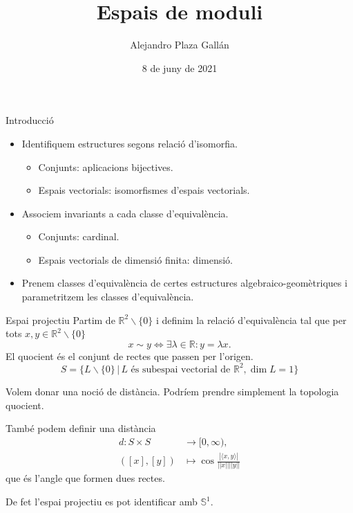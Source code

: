 \documentclass{beamer}
\title{Espais de moduli}
\author{Alejandro Plaza Gall\'{a}n}
\date{8 de juny de 2021}
\theoremstyle{definition}
\begin{document}
\begin{frame}
\titlepage
\end{frame}

\begin{frame}{Introducci\'{o}}
\begin{itemize}
\item Identifiquem estructures segons relaci\'{o} d'isomorfia.
\pause
\begin{itemize}
\item Conjunts: aplicacions bijectives.
\pause
\item Espais vectorials: isomorfismes d'espais vectorials.
\end{itemize}
\pause
\item Associem invariants a cada classe d'equival\`{e}ncia.
\pause
\begin{itemize}
\item Conjunts: cardinal.
\pause
\item Espais vectorials de dimensi\'{o} finita: dimensi\'{o}.
\end{itemize}
\pause
\item Prenem classes d'equival\`{e}ncia de certes estructures algebraico-geom\`{e}triques i parametritzem les classes d'equival\`{e}ncia.
\end{itemize}
\end{frame}

\begin{frame}{Espai projectiu}
Partim de $\mathbb{R}^2\backslash\{0\}$ i definim la relaci\'{o} d'equival\`{e}ncia tal que per tots $x,y\in\mathbb{R}^2\backslash\{0\}$
\[x\sim y\Leftrightarrow\exists\lambda\in\mathbb{R}:y=\lambda x.\]
\pause
El quocient \'{e}s el conjunt de rectes que passen per l'origen.
\[S=\{L\backslash\{0\}\,|\,L\text{ \'{e}s subespai vectorial de }\mathbb{R}^2,\dim L=1\}\]
\pause

Volem donar una noci\'{o} de dist\`{a}ncia. Podr\'{i}em prendre simplement la topologia quocient.

Tamb\'{e} podem definir una dist\`{a}ncia
\begin{align*}
d:S\times S&\longrightarrow[0,\infty),\\
([x],[y])&\longmapsto\cos\frac{|\langle x,y\rangle|}{||x||||y||}
\end{align*}
que \'{e}s l'angle que formen dues rectes.
\pause

De fet l'espai projectiu es pot identificar amb $\mathbb{S}^1$.
\end{frame}
\end{document}
